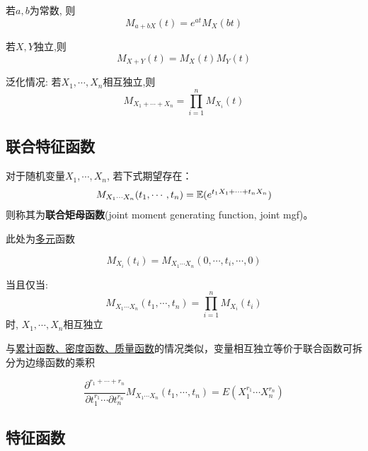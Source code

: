 \begin{proposition}
    若$a,b$为常数, 则
    \[ M_{a+b X}(t) = e^{a t}M_X(b t) \]
\end{proposition}

\begin{theorem}
    若$X,Y$独立,则
    \[ M_{X+Y}(t) = M_X(t) M_Y(t) \]

    泛化情况: 若$X_1,\cdots, X_n$相互独立,则
    \[ M_{X_1+\cdots+ X_n} = \prod_{i=1}^n M_{X_i}(t)\]
\end{theorem}

\subsection{联合特征函数}

\begin{definition}
    对于随机变量$X_1,\cdots, X_n$, 若下式期望存在：
    \[ M_{X_1\cdots X_n}(t_1,\cdots ,t_n) = \mathbb{E}(e^{t_1 X_1+\cdots + t_n X_n}) \]
    则称其为\textbf{联合矩母函数}(joint moment generating function, joint mgf)。
\end{definition}

\begin{remark}
    此处为\underline{多元}函数
\end{remark}

\begin{proposition}
    \[ M_{X_i}(t_i) = M_{X_1\cdots X_n}(0,\cdots ,t_i,\cdots ,0) \]
\end{proposition}

\begin{theorem}
    当且仅当:
    \[ M_{X_1\cdots X_n}(t_1,\cdots ,t_n) = \prod_{i=1}^n M_{X_i}(t_i) \]
    时, $X_1,\cdots, X_n$相互独立
\end{theorem}

\begin{remark}
    与\underline{累计函数、密度函数、质量函数}的情况类似，变量相互独立等价于联合函数可拆分为边缘函数的乘积
\end{remark}

\begin{theorem}
    \[ \frac{\partial^{r_1+\cdots +r_n} }{\partial t_1^{r_1} \cdots  \partial t_n^{r_n}} M_{X_1\cdots X_n}(t_1,\cdots ,t_n) = E(X_1^{r_1} \cdots X_n^{r_n}) \]
\end{theorem}

\subsection{特征函数}

